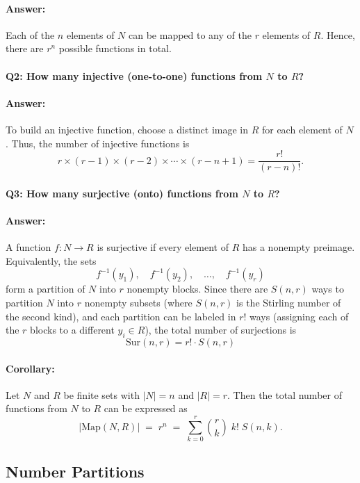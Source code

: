 \documentclass{article}
\begin{document}
\paragraph{Answer:} 
Each of the \(n\) elements of \(N\) can be mapped to any of the \(r\) elements of \(R\). Hence, there are \(r^n\) possible functions in total.

\paragraph{Q2: How many injective (one-to-one) functions from \(N\) to \(R\)?}
\paragraph{Answer:} 
To build an injective function, choose a distinct image in \(R\) for each element of \(N\). Thus, the number of injective functions is
\[
r \times (r - 1) \times (r - 2) \times \cdots \times (r - n + 1)
= \frac{r!}{(r - n)!}.
\]

\paragraph{Q3: How many surjective (onto) functions from \(N\) to \(R\)?}
\paragraph{Answer:}
A function \(f : N \to R\) is surjective if every element of \(R\) has a nonempty preimage. Equivalently, the sets 
\[
f^{-1}(y_1), \quad f^{-1}(y_2), \quad \dots, \quad f^{-1}(y_r)
\]
form a partition of \(N\) into \(r\) nonempty blocks. Since there are \(S(n,r)\) ways to partition \(N\) into \(r\) nonempty subsets (where \(S(n,r)\) is the Stirling number of the second kind), and each partition can be labeled in \(r!\) ways (assigning each of the \(r\) blocks to a different \(y_i \in R\)), the total number of surjections is
\[
\text{Sur}(n, r) = r! \cdot S(n, r)
\]

\paragraph{Corollary:}
Let \(N\) and \(R\) be finite sets with \(|N| = n\) and \(|R| = r\). Then the total number of functions from \(N\) to \(R\) can be expressed as
\[
| \mathrm{Map}(N, R) | \;=\; r^n \;=\; \sum_{k=0}^{r} \binom{r}{k} \; k! \; S(n,k).
\]


\subsection{Number Partitions}
\end{document}
